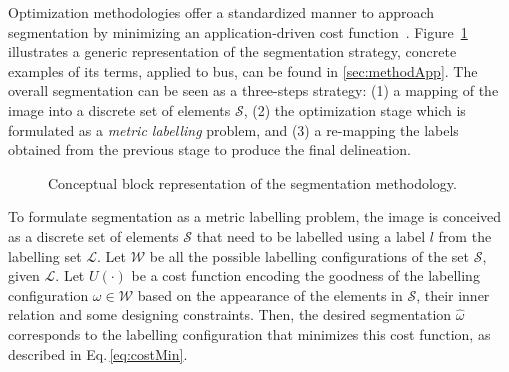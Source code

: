 \begin{figure*}[!htb]
    \caption {
      \protect\texttt{[image: fig\_legend.pdf]}
      \small Methodology Highlights.
      (a) \acs{bus} image example.
      (b) Superpixels' representation coloured using dataset's accompanying multi-label \acs{gt}.
      (c) \ac{gt} color code.
      (d) Data term: cost of labelling all sites as pectoral, lungs, adipose tissue or lesion.
      For illustration purposes, highly saturated colour indicates a low data cost - i.e., high confidence to assign the label associated with the color.
      (e) Pairwise term: labelling configurations with more boundaries produce higher pairwise term cost.}
    \label{fig:methodTerms}
\end{figure*}


Optimization methodologies offer a standardized manner to approach segmentation by minimizing an application-driven cost function~\cite{cremers2007review}.
Figure~\ref{fig:method} illustrates a generic representation of the segmentation strategy,
concrete examples of its terms, applied to \ac{bus}, can be found in \cref{sec:methodApp}.
The overall segmentation can be seen as a three-steps strategy:
(1) a mapping of the image into a discrete set of elements $\mathcal{S}$,
(2) the optimization stage which is formulated as a \emph{metric labelling} problem,
and (3) a re-mapping the labels obtained from the previous stage to produce the final delineation.


\begin{figure}[htpb]
  \scriptsize
  \centering
  
  \caption{Conceptual block representation of the segmentation methodology.}%
  \label{fig:method}
\end{figure}


To formulate segmentation as a metric labelling problem, the image is conceived as a discrete set of elements $\mathcal{S}$ that need to be labelled using a label $l$ from the labelling set $\mathcal{L}$.
Let $\mathcal{W}$ be all the possible labelling configurations of the set $\mathcal{S}$, given $\mathcal{L}$.
Let $U(\cdot)$ be a cost function encoding the goodness of the labelling configuration $\omega \in \mathcal{W}$ based on the appearance of the elements in $\mathcal{S}$, their inner relation and some designing constraints.
Then, the desired segmentation $\hat{\omega}$ corresponds to the labelling configuration that minimizes this cost function, as described in Eq.\,\eqref{eq:costMin}.

